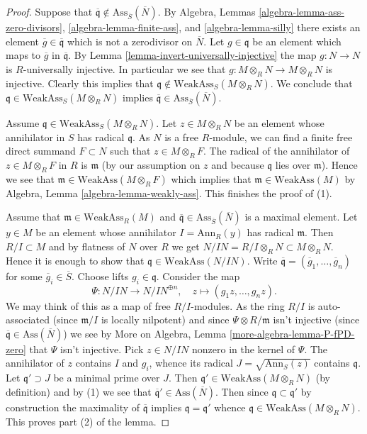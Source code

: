 \begin{proof}
Suppose that
$\overline{\mathfrak q} \not \in \text{Ass}_{\overline{S}}(\overline{N})$.
By
Algebra, Lemmas \ref{algebra-lemma-ass-zero-divisors},
\ref{algebra-lemma-finite-ass}, and
\ref{algebra-lemma-silly}
there exists an element $\overline{g} \in \overline{\mathfrak q}$
which is not a zerodivisor on $\overline{N}$. Let $g \in \mathfrak q$
be an element which maps to $\overline{g}$ in $\overline{\mathfrak q}$. By
Lemma \ref{lemma-invert-universally-injective}
the map $g : N \to N$ is $R$-universally injective. In particular
we see that $g : M \otimes_R N \to M \otimes_R N$ is injective.
Clearly this implies that
$\mathfrak q \not \in \text{WeakAss}_S(M \otimes_R N)$.
We conclude that $\mathfrak q \in \text{WeakAss}_S(M \otimes_R N)$ implies
$\overline{\mathfrak q} \in \text{Ass}_{\overline{S}}(\overline{N})$.

\medskip\noindent
Assume $\mathfrak q \in \text{WeakAss}_S(M \otimes_R N)$.
Let $z \in M \otimes_R N$ be an element whose annihilator in $S$
has radical $\mathfrak q$. As $N$ is a free $R$-module, we can find
a finite free direct summand $F \subset N$ such that
$z \in M \otimes_R F$. The radical of the annihilator of
$z \in M \otimes_R F$ in $R$ is $\mathfrak m$ (by our assumption on $z$
and because $\mathfrak q$ lies over $\mathfrak m$). Hence we see that
$\mathfrak m \in \text{WeakAss}(M \otimes_R F)$ which implies
that $\mathfrak m \in \text{WeakAss}(M)$ by
Algebra, Lemma \ref{algebra-lemma-weakly-ass}.
This finishes the proof of (1).

\medskip\noindent
Assume that $\mathfrak m \in \text{WeakAss}_R(M)$ and
$\overline{\mathfrak q} \in \text{Ass}_{\overline{S}}(\overline{N})$
is a maximal element.
Let $y \in M$ be an element whose annihilator $I = \text{Ann}_R(y)$
has radical $\mathfrak m$. Then $R/I \subset M$ and by flatness of $N$
over $R$ we get $N/IN = R/I \otimes_R N \subset M \otimes_R N$. Hence
it is enough to show that $\mathfrak q \in \text{WeakAss}(N/IN)$.
Write $\overline{\mathfrak q} = (\overline{g}_1, \ldots, \overline{g}_n)$
for some $\overline{g}_i \in \overline{S}$. Choose lifts
$g_i \in \mathfrak q$. Consider the map
$$
\Psi : N/IN \longrightarrow N/IN^{\oplus n}, \quad
z \longmapsto (g_1z, \ldots, g_nz).
$$
We may think of this as a map of free $R/I$-modules. As the ring
$R/I$ is auto-associated (since $\mathfrak m/I$ is locally nilpotent)
and since $\Psi \otimes R/\mathfrak m$ isn't injective (since
$\overline{\mathfrak q} \in \text{Ass}(\overline{N})$) we see by
More on Algebra, Lemma \ref{more-algebra-lemma-P-fPD-zero}
that $\Psi$ isn't injective. Pick $z \in N/IN$ nonzero in the kernel
of $\Psi$. The annihilator of $z$ contains $I$ and $g_i$, whence
its radical $J = \sqrt{\text{Ann}_S(z)}$ contains $\mathfrak q$.
Let $\mathfrak q' \supset J$ be a minimal prime over $J$.
Then $\mathfrak q' \in \text{WeakAss}(M \otimes_R N)$ (by definition)
and by (1) we see that
$\overline{\mathfrak q}' \in \text{Ass}(\overline{N})$.
Then since $\mathfrak q \subset \mathfrak q'$ by construction the
maximality of $\overline{\mathfrak q}$ implies $\mathfrak q = \mathfrak q'$
whence $\mathfrak q \in \text{WeakAss}(M \otimes_R N)$.
This proves part (2) of the lemma.
\end{proof}

